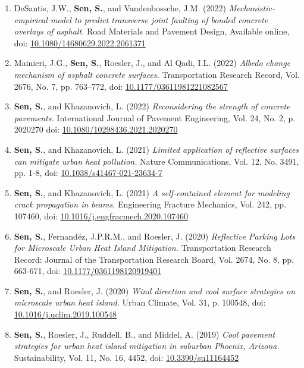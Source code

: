 \documentclass[12pt]{article}
\begin{document}
\begin{enumerate}[label=(J\arabic*)]
	\item DeSantis, J.W., \textbf{Sen, S.}, and Vandenbossche, J.M. (2022) \textit{Mechanistic-empirical model to predict transverse joint faulting of bonded concrete overlays of asphalt.} Road Materials and Pavement Design, Available online, doi: \href{https://doi.org/10.1080/14680629.2022.2061371}{10.1080/14680629.2022.2061371}
	\item Mainieri, J.G., \textbf{Sen, S.}, Roesler, J., and Al Qadi, I.L. (2022) \textit{Albedo change mechanism of asphalt concrete surfaces.} Transportation Research Record, Vol. 2676, No. 7, pp. 763–772, doi: \href{https://doi.org/10.1177/036119812210825670}{10.1177/03611981221082567}
	\item \textbf{Sen, S.}, and Khazanovich, L. (2022) \textit{Reconsidering the strength of concrete pavements.} International Journal of Pavement Engineering, Vol. 24, No. 2, p. 2020270 doi: \href{https://doi.org/10.1080/10298436.2021.2020270}{10.1080/10298436.2021.2020270}
	\item \textbf{Sen, S.}, and Khazanovich, L. (2021) \textit{Limited application of reflective surfaces can mitigate urban heat pollution.} Nature Communications, Vol. 12, No. 3491, pp. 1-8, doi: \href{https://doi.org/10.1038/s41467-021-23634-7}{10.1038/s41467-021-23634-7}
	\item \textbf{Sen, S.}, and Khazanovich, L. (2021) \textit{A self-contained element for modeling crack propagation in beams.} Engineering Fracture Mechanics, Vol. 242, pp. 107460, doi: \href{https://doi.org/10.1016/j.engfracmech.2020.107460}{10.1016/j.engfracmech.2020.107460}			
	\item \textbf{Sen, S.}, Fernand\'ez, J.P.R.M., and Roesler, J. (2020) \textit{Reflective Parking Lots for Microscale Urban Heat Island Mitigation.}  Transportation Research Record: Journal of the Transportation Research Board, Vol. 2674, No. 8, pp. 663-671, doi: \href{https://doi.org/10.1177/0361198120919401}{10.1177/0361198120919401}	
		\item \textbf{Sen, S.}, and Roesler, J. (2020) \textit{Wind direction and cool surface strategies on microscale urban heat island.}  Urban Climate, Vol. 31, p. 100548, doi: \href{https://doi.org/10.1016/j.uclim.2019.100548}{10.1016/j.uclim.2019.100548}
	\item \textbf{Sen, S.}, Roesler, J., Ruddell, B., and Middel, A. (2019) \textit{Cool pavement strategies for urban heat island mitigation in suburban Phoenix, Arizona.}  Sustainability, Vol. 11, No. 16, 4452, doi: \href{https://doi.org/10.3390/su11164452}{10.3390/su11164452}

\end{enumerate}
\end{document}

